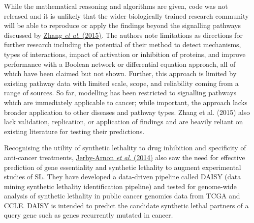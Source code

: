 While the mathematical reasoning and algorithms are given, code was not released and it is unlikely that the wider biologically trained research community will be able to reproduce or apply the findings beyond the signalling pathways discussed by \hyperlink{ENREF117}{Zhang}\hyperlink{ENREF117}{\textit{ et al.}}\hyperlink{ENREF117}{ (2015)}. The authors note limitations as directions for further research including the potential of their method to detect mechanisms, types of interactions, impact of activation or inhibition of proteins, and improve performance with a Boolean network or differential equation approach, all of which have been claimed but not shown. Further, this approach is limited by existing pathway data with limited scale, scope, and reliability coming from a range of sources. So far, modelling has been restricted to signalling pathways which are immediately applicable to cancer; while important, the approach lacks broader application to other diseases and pathway types. Zhang et al. (2015) also lack validation, replication, or application of findings and are heavily reliant on existing literature for testing their predictions.  

Recognising the utility of synthetic lethality to drug inhibition and specificity of anti-cancer treatments, \hyperlink{ENREF53}{Jerby-Arnon}\hyperlink{ENREF53}{\textit{ et al.}}\hyperlink{ENREF53}{ (2014)} also saw the need for effective prediction of gene essentiality and synthetic lethality to augment experimental studies of SL. They have developed a data-driven pipeline called DAISY (data mining synthetic lethality identification pipeline) and tested for genome-wide analysis of synthetic lethality in public cancer genomics data from TCGA and CCLE. DAISY is intended to predict the candidate synthetic lethal partners of a query gene such as genes recurrently mutated in cancer.  

